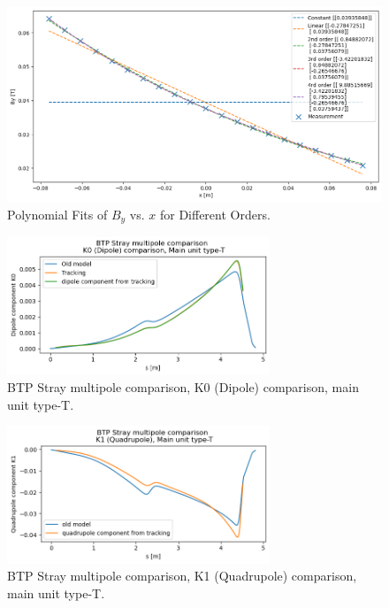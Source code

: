 \begin{figure}[H]
\centering
\includegraphics[width=1.0\textwidth]{02_Simulation/images/fit_of_bfield.png}
\caption{Polynomial Fits of \( B_y \) vs. \( x \) for Different Orders.}
\label{fig:fit_bfield}
\end{figure}

\begin{figure}[H]
\centering
\includegraphics[width=0.7\textwidth]{02_Simulation/images/mcp_dipole.png}
\caption{BTP Stray multipole comparison, K0 (Dipole) comparison, main unit type-T.}
\label{fig:mcp_dipole}
\end{figure}

\begin{figure}[H]
\centering
\includegraphics[width=0.7\textwidth]{02_Simulation/images/mcp_quadrupole.png}
\caption{BTP Stray multipole comparison, K1 (Quadrupole) comparison, main unit type-T.}
\label{fig:mcp_quadrupole}
\end{figure}

